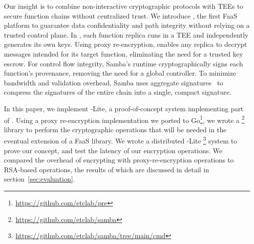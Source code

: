 %
Our insight is to combine non-interactive cryptographic protocols with
TEEs to secure function chains without centralized trust.
%
We introduce \SystemName, the first FaaS platform to guarantee data
confidentiality and path integrity without relying on a trusted control plane.
%
In \SystemName,  each function replica runs in a TEE and independently generates its own keys.
%
Using proxy re-encryption,  \SystemName enables any replica to decrypt
messages intended for its target function, eliminating the need for a trusted
key escrow.
%
For control flow integrity, Samba's runtime cryptographically signs each
function's provenance, removing the need for a global controller.
%
To minimize bandwidth and validation overhead, Samba uses aggregate
signatures~\cite{03-eurocrypt-aggregate_signatures_bilinear_maps} to compress
the signatures of the entire chain into a single, compact signature.


In this paper, we implement \SystemName-Lite, a proof-of-concept system implementing part  of \SystemName.
%
Using a proxy re-encryption implementation we ported to Go\footnote{\url{https://github.com/etclab/pre}}, we wrote a \SystemName \footnote{\url{https://github.com/etclab/samba}} library to perform the cryptographic operations that will be needed in the eventual \SystemName extension of a FaaS library.
%
We wrote a distributed \SystemName-Lite \footnote{\url{https://github.com/etclab/samba/tree/main/cmd}} system to prove our concept, and test the latency of our encryption operations.
%
We compared the overhead of encrypting with \SystemName proxy-re-encryption operations to RSA-based operations, the results of which are discussed in detail in section~\ref{sec:evaluation}.




